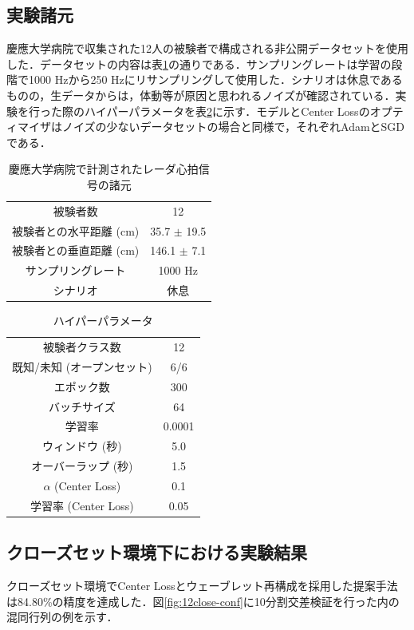 \subsection{実験諸元}
慶應大学病院で収集された12人の被験者で構成される非公開データセットを使用した．データセットの内容は表\ref{table:keio_hospital}の通りである．サンプリングレートは学習の段階で1000 Hzから250 Hzにリサンプリングして使用した．シナリオは休息であるものの，生データからは，体動等が原因と思われるノイズが確認されている．実験を行った際のハイパーパラメータを表\ref{table:12-parameter}に示す．モデルとCenter Lossのオプティマイザはノイズの少ないデータセットの場合と同様で，それぞれAdamとSGDである．

\begin{table}[H]
  \caption{慶應大学病院で計測されたレーダ心拍信号の諸元}
  \centering
  \begin{tabular}{cc}
  \hline
  被験者数 & 12 \\
  被験者との水平距離 (cm) & 35.7 $\pm$ 19.5 \\
  被験者との垂直距離 (cm) & 146.1 $\pm$ 7.1 \\
  サンプリングレート & 1000 Hz \\
  シナリオ & 休息 \\
  \hline
  \end{tabular}
  \label{table:keio_hospital}
\end{table}

\begin{table}[H]
  \caption{ハイパーパラメータ}
  \centering
  \begin{tabular}{cc}
  \hline
  被験者クラス数 & 12 \\
  既知/未知 (オープンセット) & 6/6 \\
  エポック数 & 300 \\
  バッチサイズ & 64 \\
  学習率 & 0.0001 \\
  ウィンドウ (秒) & 5.0 \\
  オーバーラップ (秒) & 1.5 \\
  $\alpha$ (Center Loss) & 0.1 \\
  学習率 (Center Loss) & 0.05 \\
  \hline
  \end{tabular}
  \label{table:12-parameter}
\end{table}

\subsection{クローズセット環境下における実験結果}
クローズセット環境でCenter Lossとウェーブレット再構成を採用した提案手法は84.80\%の精度を達成した．図\ref{fig:12close-conf}に10分割交差検証を行った内の混同行列の例を示す．



